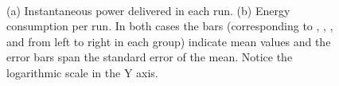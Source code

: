\begin{figure}[!t]
~~
\caption{(a) Instantaneous power delivered in each run. (b) Energy
  consumption per run. In both cases the bars (corresponding to
  \raspberrynsp, \tabletnsp, \laptopnsp, \iMac and \blade from left to
  right in each group) indicate mean values and the error bars span
  the standard error of the mean. Notice the logarithmic scale in the
  Y axis.\label{fig:powerenergy}} 
\end{figure}



